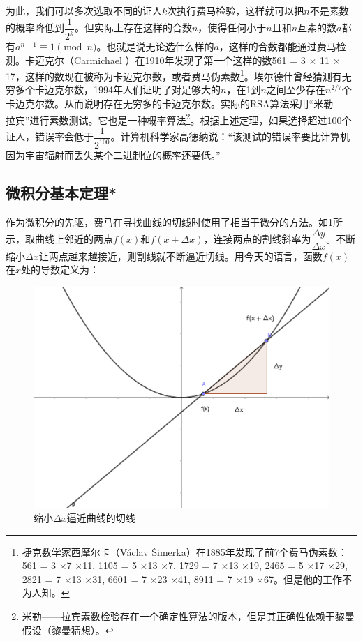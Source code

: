 \documentclass[b5paper]{ctexart}
\begin{document}
为此，我们可以多次选取不同的证人$k$次执行费马检验，这样就可以把$n$不是素数的概率降低到$\dfrac{1}{2^k}$。但实际上存在这样的合数$n$，使得任何小于$n$且和$n$互素的数$a$都有$a^{n-1} \equiv 1 \pmod n$。也就是说无论选什么样的$a$，这样的合数都能通过费马检测。卡迈克尔（Carmichael ）在1910年发现了第一个这样的数561 = 3 $\times$ 11 $\times$ 17，这样的数现在被称为卡迈克尔数，或者费马伪素数\footnote{捷克数学家西摩尔卡（Václav Šimerka）在1885年发现了前7个费马伪素数：561 = 3 $\times$7 $\times$11, 1105 = 5 $\times$13 $\times$7, 1729 = 7 $\times$13 $\times$19, 2465 = 5 $\times$17 $\times$29, 2821 = 7 $\times$13 $\times$31, 6601 = 7 $\times$23 $\times$41, 8911 = 7 $\times$19 $\times$67。但是他的工作不为人知。}。埃尔德什曾经猜测有无穷多个卡迈克尔数，1994年人们证明了对足够大的$n$，在1到$n$之间至少存在$n^{2/7}$个卡迈克尔数。从而说明存在无穷多的卡迈克尔数\cite{Carmichael-number}。实际的RSA算法采用“米勒——拉宾”进行素数测试。它也是一种概率算法\footnote{米勒——拉宾素数检验存在一个确定性算法的版本，但是其正确性依赖于黎曼假设（黎曼猜想）\cite{Miller-1976}。}。根据上述定理，如果选择超过100个证人，错误率会低于$\dfrac{1}{2^{100}}$。计算机科学家高德纳说：“该测试的错误率要比计算机因为宇宙辐射而丢失某个二进制位的概率还要低。”

\subsection{微积分基本定理*}
作为微积分的先驱，费马在寻找曲线的切线时使用了相当于微分的方法。如\cref{fig:tagent}所示，取曲线上邻近的两点$f(x)$和$f(x + \Delta x)$，连接两点的割线斜率为$\dfrac{\Delta y}{\Delta x}$。不断缩小$\Delta x$让两点越来越接近，则割线就不断逼近切线。用今天的语言，函数$f(x)$在$x$处的导数定义为：

\begin{figure}[htbp]
 \centering
 \includegraphics[scale=0.4]{img/tagent}
 \caption{缩小$\Delta x$逼近曲线的切线}
 \label{fig:tagent}
\end{figure}
\end{document}

